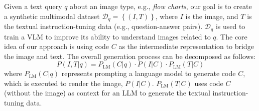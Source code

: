 
Given a text query $q$ about an image type, e.g., \textit{flow charts}, our goal is to create a synthetic multimodal dataset $\mathcal{D}_q = \left\{\left(I, T\right)\right\}$, where $I$ is the image, and $T$ is the textual instruction-tuning data (e.g., question-answer pairs). 
$\mathcal{D}_q$ is used to train a VLM to improve its ability to understand images related to $q$. 
The core idea of our approach is using code $C$ as the intermediate representation to bridge the image and text. 
The overall generation process can be decomposed as follows:
\begin{equation*}
    P\left(I, T | q\right) = P_{\text{LM}}\left(C|q\right) \cdot P\left(I|C\right) \cdot P_{\text{LM}}\left(T|C\right)
\end{equation*}
where $P_\text{LM}\left(C|q\right)$ represents prompting a language model to generate code $C$, which is executed to render the image, $P\left(I|C\right)$.
$P_\text{LM}\left(T|C\right)$ uses code $C$ (without the image) as context for an LLM to generate the textual instruction-tuning data.